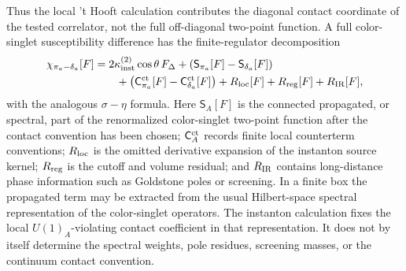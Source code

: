 \begin{controlledapproximation}
Thus the local 't Hooft calculation contributes the diagonal contact
coordinate of the tested correlator, not the full off-diagonal two-point
function.  A full color-singlet susceptibility difference has the
finite-regulator decomposition
\begin{equation}
\begin{aligned}
  \chi_{\pi_a-\delta_a}[F]
  &=
  2\kappa_{\rm inst}^{(2)}\cos\theta\,F_\Delta
  +
  \left(\mathsf S_{\pi_a}[F]-\mathsf S_{\delta_a}[F]\right)  \\
  &\qquad
  +
  \left(\mathsf C_{\pi_a}^{\rm ct}[F]-\mathsf C_{\delta_a}^{\rm ct}[F]\right)
  +
  R_{\rm loc}[F]+R_{\rm reg}[F]+R_{\rm IR}[F],
\end{aligned}
  \label{eq:instanton-tested-susceptibility-full-decomposition}
\end{equation}
with the analogous \(\sigma-\eta\) formula.  Here
\(\mathsf S_A[F]\) is the connected propagated, or spectral, part of the
renormalized color-singlet two-point function after the contact convention has
been chosen; \(\mathsf C_A^{\rm ct}\) records finite local counterterm
conventions; \(R_{\rm loc}\) is the omitted derivative expansion of the
instanton source kernel; \(R_{\rm reg}\) is the cutoff and volume residual;
and \(R_{\rm IR}\) contains long-distance phase information such as Goldstone
poles or screening.  In a finite box the propagated term may be extracted from
the usual Hilbert-space spectral representation of the color-singlet
operators.  The instanton calculation fixes the local \(U(1)_A\)-violating
contact coefficient in that representation.  It does not by itself determine
the spectral weights, pole residues, screening masses, or the continuum
contact convention.
\end{controlledapproximation}

